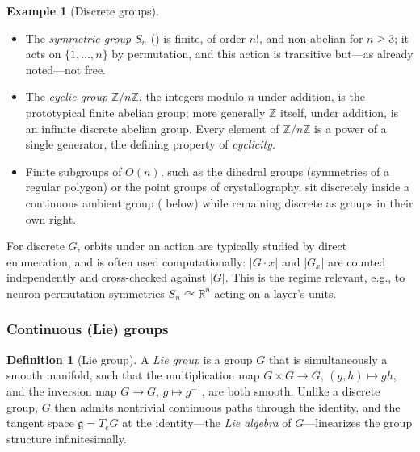 \documentclass[11pt]{article}
\theoremstyle{plain}
\theoremstyle{definition}
\newtheorem{Definition}{Definition}[section]
\newtheorem{Example}{Example}[section]
\begin{document}
\begin{Example}[Discrete groups]
\label{ex:discrete-groups}
\begin{itemize}
    \item The \emph{symmetric group} $S_n$ () is
    finite, of order $n!$, and non-abelian for $n \geq 3$; it acts on
    $\{1,\dots,n\}$ by permutation, and this action is transitive but---as
    already noted---not free.
    \item The \emph{cyclic group} $\mathbb{Z}/n\mathbb{Z}$, the integers
    modulo $n$ under addition, is the prototypical finite abelian group; more
    generally $\mathbb{Z}$ itself, under addition, is an infinite discrete
    abelian group. Every element of $\mathbb{Z}/n\mathbb{Z}$ is a power of a
    single generator, the defining property of \emph{cyclicity}.
    \item Finite subgroups of $O(n)$, such as the dihedral groups
    (symmetries of a regular polygon) or the point groups of crystallography,
    sit discretely inside a continuous ambient group
    ( below) while remaining discrete as groups
    in their own right.
\end{itemize}
\end{Example}

For discrete $G$, orbits under an action are typically studied by direct
enumeration, and  is often used
computationally: $|G\cdot x|$ and $|G_x|$ are counted independently and
cross-checked against $|G|$. This is the regime relevant, e.g., to
neuron-permutation symmetries $S_n \curvearrowright \mathbb{R}^{n}$ acting on
a layer's units.

\subsubsection{Continuous (Lie) groups}
\label{subsubsec:lie-groups}

\begin{Definition}[Lie group]
\label{def:lie-group}
A \emph{Lie group} is a group $G$ that is simultaneously a smooth manifold,
such that the multiplication map $G \times G \to G$, $(g,h) \mapsto gh$, and
the inversion map $G \to G$, $g \mapsto g^{-1}$, are both smooth. Unlike a
discrete group, $G$ then admits nontrivial continuous paths through the
identity, and the tangent space $\mathfrak{g} = T_e G$ at the identity---the
\emph{Lie algebra} of $G$---linearizes the group structure infinitesimally.
\end{Definition}
\end{document}
